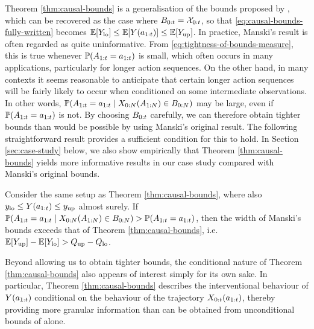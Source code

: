Theorem \ref{thm:causal-bounds} is a generalisation of the bounds proposed by \cite{manski}, which can be recovered as the case where $B_{0:t} = \mathcal{X}_{0:t}$, so that \eqref{eq:causal-bounds-fully-written} becomes $\mathbb{E}[Y_{\mathrm{lo}}] \leq \mathbb{E}[Y(a_{1:t})] \leq \mathbb{E}[Y_{\mathrm{up}}]$.
In practice, Manski's result is often regarded as quite uninformative.
From \eqref{eq:tightness-of-bounds-measure}, this is true whenever $\mathbb{P}(A_{1:t} = a_{1:t})$ is small, which often occurs in many applications, particularly for longer action sequences.
On the other hand, in many contexts it seems reasonable to anticipate that certain longer action sequences will be fairly likely to occur when conditioned on some intermediate observations.
In other words, $\mathbb{P}(A_{1:t} = a_{1:t} \mid X_{0:N}(A_{1:N}) \in B_{0:N})$ may be large, even if $\mathbb{P}(A_{1:t} = a_{1:t})$ is not.
By choosing $B_{0:t}$ carefully, we can therefore obtain tighter bounds than would be possible by using Manski's original result.
The following straightforward result provides a sufficient condition for this to hold.
In Section \ref{sec:case-study} below, we also show empirically that Theorem \ref{thm:causal-bounds} yields more informative results in our case study compared with Manski's original bounds.




\begin{proposition} \label{prop:our-bounds-vs-manskis}
    Consider the same setup as Theorem \ref{thm:causal-bounds}, where also $y_{\mathrm{lo}} \leq Y(a_{1:t}) \leq y_{\mathrm{up}}$ almost surely.
    If $\mathbb{P}(A_{1:t} = a_{1:t} \mid X_{0:N}(A_{1:N}) \in B_{0:N}) > \mathbb{P}(A_{1:t} = a_{1:t})$, then the width of Manski's bounds exceeds that of Theorem \ref{thm:causal-bounds}, i.e.\ $\mathbb{E}[Y_{\mathrm{up}}] - \mathbb{E}[Y_{\mathrm{lo}}] > Q_{\mathrm{up}} - Q_{\mathrm{lo}}$.
\end{proposition}

Beyond allowing us to obtain tighter bounds, the conditional nature of Theorem \ref{thm:causal-bounds} also appears of interest simply for its own sake.
In particular, Theorem \ref{thm:causal-bounds} describes the interventional behaviour of $Y(a_{1:t})$ conditional on the behaviour of the trajectory $X_{0:t}(a_{1:t})$, thereby providing more granular information than can be obtained from unconditional bounds of \cite{manski} alone.

